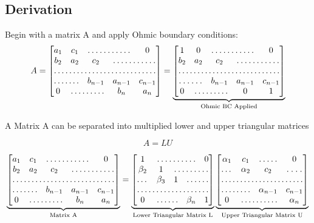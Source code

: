 \documentclass[12pt]{article}
\begin{document}
\subsection{Derivation}
Begin with a matrix A and apply Ohmic boundary conditions: \\
\[
A=
\begin{bmatrix}
    a_{1} & c_{1} & \hdotsfor{2} & 0 \\
    b_{2} & a_{2} &  c_{2} & \hdotsfor{2}  \\
   \hdotsfor{5} \\
   \hdotsfor{2}  & b_{n-1} & a_{n-1} &  c_{n-1} \\
   0 & \hdotsfor{2}  & b_{n} & a_{n}
\end{bmatrix}
=
\underbrace{
\begin{bmatrix}
    1 & 0 & \hdotsfor{2} & 0 \\
    b_{2} & a_{2} &  c_{2} & \hdotsfor{2}  \\
   \hdotsfor{5} \\
   \hdotsfor{2}  & b_{n-1} & a_{n-1} &  c_{n-1} \\
   0 & \hdotsfor{2}  & 0 & 1
\end{bmatrix}}_{\text{Ohmic BC Applied}}
\]

A Matrix A can be separated into multiplied lower and upper triangular matrices

\[
A=LU
\]

\[
\underbrace{
\begin{bmatrix}
    a_{1} & c_{1} & \hdotsfor{2} & 0 \\
    b_{2} & a_{2} &  c_{2} & \hdotsfor{2}  \\
   \hdotsfor{5} \\
   \hdotsfor{2}  & b_{n-1} & a_{n-1} &  c_{n-1} \\
   0 & \hdotsfor{2}  & b_{n} & a_{n}
\end{bmatrix}}_{\text{Matrix A}}
=
\underbrace{
\begin{bmatrix}
    1 &  \hdotsfor{3} & 0  \\
   \beta_{2} & 1 &  \hdotsfor{3}  \\
   \dots & \beta_{3} & 1 &  \hdotsfor{2}  \\
   \hdotsfor{5} \\
   0 & \hdotsfor{2}  & \beta_{n} & 1
\end{bmatrix}}_{\text{Lower Triangular Matrix L}}
\underbrace{
\begin{bmatrix}
    \alpha_{1} & c_{1} & \hdotsfor{1} & 0 \\
    \dots & \alpha_{2} &  c_{2} & \hdotsfor{1}  \\
   \hdotsfor{4} \\
   \hdotsfor{2} & \alpha_{n-1} &  c_{n-1} \\
   0 & \hdotsfor{2} & \alpha_{n}
\end{bmatrix}}_{\text{Upper Triangular Matrix U}}
\]
\end{document}
